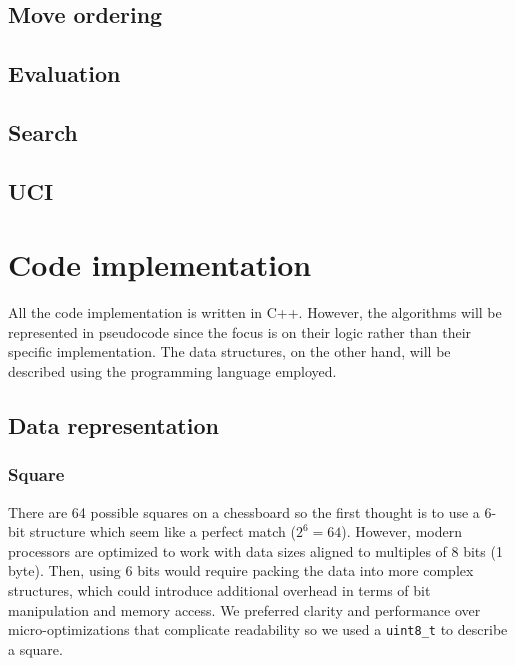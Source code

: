 \subsection{Move ordering}

\subsection{Evaluation}

\subsection{Search}

\subsection{UCI}

\section{Code implementation}
\label{sec:code}

All the code implementation is written in C++. However, the algorithms will be represented in pseudocode since the focus is on their logic rather than their specific implementation. The data structures, on the other hand, will be described using the programming language employed.

\subsection{Data representation}

\subsubsection{Square}

There are 64 possible squares on a chessboard so the first thought is to use a 6-bit structure which seem like a perfect match ($2^6 = 64$). However, modern processors are optimized to work with data sizes aligned to multiples of 8 bits (1 byte). Then, using 6 bits would require packing the data into more complex structures, which could introduce additional overhead in terms of bit manipulation and memory access. We preferred clarity and performance over micro-optimizations that complicate readability so we used a \texttt{uint8\_t} to describe a square.

\vspace{1em}

